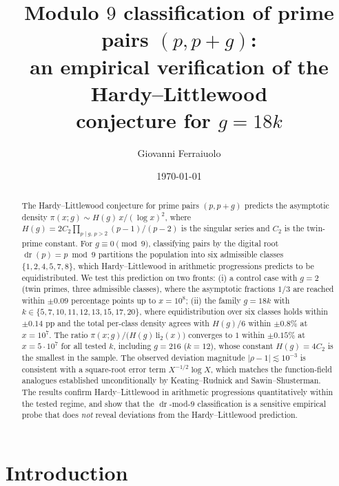 \documentclass[11pt]{amsart}
\title{Modulo $9$ classification of prime pairs $(p,p+g)$:\\
an empirical verification of the Hardy--Littlewood\\
conjecture for $g=18k$}
\author{Giovanni Ferraiuolo}
\date{\today}
\theoremstyle{plain}
\theoremstyle{definition}
\theoremstyle{remark}
\DeclareMathOperator{\dr}{dr}
\begin{document}
\begin{abstract}
The Hardy--Littlewood conjecture for prime pairs $(p,p+g)$ predicts the
asymptotic density $\pi(x;g) \sim H(g)\,x/(\log x)^2$, where
$H(g) = 2C_2 \prod_{p \mid g,\,p>2}(p-1)/(p-2)$ is the singular series
and $C_2$ is the twin-prime constant. For $g \equiv 0 \pmod 9$,
classifying pairs by the digital root $\dr(p)=p \bmod 9$ partitions
the population into six admissible classes $\{1,2,4,5,7,8\}$, which
Hardy--Littlewood in arithmetic progressions predicts to be
equidistributed. We test this prediction on two fronts: (i) a control
case with $g=2$ (twin primes, three admissible classes), where the
asymptotic fractions $1/3$ are reached within $\pm 0.09$ percentage
points up to $x = 10^8$; (ii) the family $g = 18k$ with
$k\in\{5,7,10,11,12,13,15,17,20\}$, where equidistribution over six
classes holds within $\pm 0.14$ pp and the total per-class density
agrees with $H(g)/6$ within $\pm 0.8\%$ at $x = 10^7$. The ratio
$\pi(x;g)/\bigl(H(g)\,\mathrm{li}_2(x)\bigr)$ converges to $1$ within
$\pm 0.15\%$ at $x = 5\cdot 10^7$ for all tested $k$, including
$g=216$ ($k=12$), whose constant $H(g) = 4 C_2$ is the smallest in the
sample. The observed deviation magnitude $|\rho - 1| \lesssim 10^{-3}$
is consistent with a square-root error term $X^{-1/2} \log X$, which
matches the function-field analogues established unconditionally by
Keating--Rudnick and Sawin--Shusterman. The results confirm
Hardy--Littlewood in arithmetic progressions quantitatively within
the tested regime, and show that the $\dr$-mod-$9$ classification is
a sensitive empirical probe that does \emph{not} reveal deviations
from the Hardy--Littlewood prediction.
\end{abstract}


\maketitle

\section{Introduction}\label{sec:intro}
\end{document}
